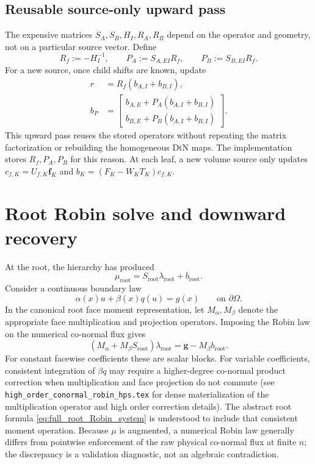 \documentclass[11pt]{article}
\begin{document}
\subsection{Reusable source-only upward pass}
The expensive matrices $S_A,S_B,H_I,R_A,R_B$ depend on the
operator and geometry, not on a particular source vector.  Define
\begin{equation}\label{eq:full_source_inverse}
 R_f:=-H_I^{-1},\qquad
 P_A:=S_{A,EI}R_f,\qquad P_B:=S_{B,EI}R_f.
\end{equation}
For a new source, once child shifts are known, update
\begin{align}\label{eq:full_source_pass}
 r&=R_f(b_{A,I}+b_{B,I}),\\
 b_P&=\begin{bmatrix}
 b_{A,E}+P_A(b_{A,I}+b_{B,I})\\
 b_{B,E}+P_B(b_{A,I}+b_{B,I})
 \end{bmatrix}.
\end{align}
This upward pass reuses the stored operators without repeating the
matrix factorization or rebuilding the homogeneous DtN maps.  The
implementation stores $R_f,P_A,P_B$ for this reason.  At each leaf,
a new volume source only updates
$c_{f,K}=U_{f,K}\bm f_K$ and
$b_K=(F_K-W_KT_K)c_{f,K}$.

\section{Root Robin solve and downward recovery}
\label{sec:full_root}
At the root, the hierarchy has produced
\begin{equation}\label{eq:full_root_map}
 \mu_{\mathrm{root}}
 =S_{\mathrm{root}}\lambda_{\mathrm{root}}
 +b_{\mathrm{root}}.
\end{equation}
Consider a continuous boundary law
\begin{equation}\label{eq:full_root_Robin}
 \alpha(x)u+\beta(x)q(u)=g(x)
 \qquad\text{on }\partial\Omega.
\end{equation}
In the canonical root face moment representation, let
$M_\alpha,M_\beta$ denote the appropriate face multiplication and
projection operators.  Imposing the Robin law on the numerical
co-normal flux gives
\begin{equation}\label{eq:full_root_Robin_system}
 \boxed{\displaystyle
 (M_\alpha+M_\beta S_{\mathrm{root}})
 \lambda_{\mathrm{root}}
 =\bm g-M_\beta b_{\mathrm{root}}.}
\end{equation}
For constant facewise coefficients these are scalar blocks.  For
variable coefficients, consistent integration of $\beta q$ may require
a higher-degree co-normal product correction when multiplication and
face projection do not commute (see
\texttt{high\_order\_conormal\_robin\_hps.tex} for dense materialization
of the multiplication operator and high order correction details).
The abstract root formula
\eqref{eq:full_root_Robin_system} is understood to include that
consistent moment operation.  Because $\mu$ is augmented, a numerical
Robin law generally differs from pointwise enforcement of the raw
physical co-normal flux at finite $n$; the discrepancy is a validation
diagnostic, not an algebraic contradiction.
\end{document}
